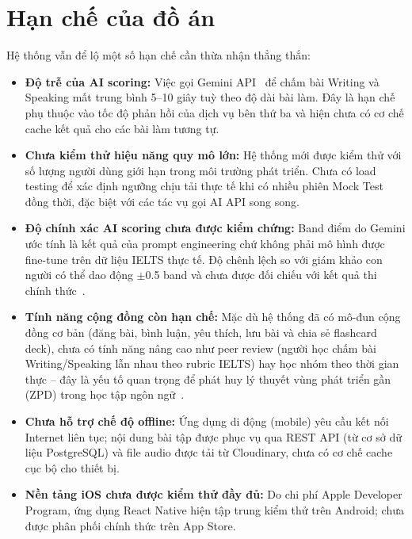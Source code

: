 \section{Hạn chế của đồ án}

Hệ thống vẫn để lộ một số hạn chế cần thừa nhận thẳng thắn:

\begin{itemize}
    \item \textbf{Độ trễ của AI scoring:} Việc gọi Gemini API~\cite{gemini-api} để chấm bài Writing và Speaking mất trung bình 5--10 giây tuỳ theo độ dài bài làm. Đây là hạn chế phụ thuộc vào tốc độ phản hồi của dịch vụ bên thứ ba và hiện chưa có cơ chế cache kết quả cho các bài làm tương tự.

    \item \textbf{Chưa kiểm thử hiệu năng quy mô lớn:} Hệ thống mới được kiểm thử với số lượng người dùng giới hạn trong môi trường phát triển. Chưa có load testing để xác định ngưỡng chịu tải thực tế khi có nhiều phiên Mock Test đồng thời, đặc biệt với các tác vụ gọi AI API song song.

    \item \textbf{Độ chính xác AI scoring chưa được kiểm chứng:} Band điểm do Gemini ước tính là kết quả của prompt engineering chứ không phải mô hình được fine-tune trên dữ liệu IELTS thực tế. Độ chênh lệch so với giám khảo con người có thể dao động $\pm$0.5 band và chưa được đối chiếu với kết quả thi chính thức~\cite{bachman1990fundamental}.

    \item \textbf{Tính năng cộng đồng còn hạn chế:} Mặc dù hệ thống đã có mô-đun cộng đồng cơ bản (đăng bài, bình luận, yêu thích, lưu bài và chia sẻ flashcard deck), chưa có tính năng nâng cao như peer review (người học chấm bài Writing/Speaking lẫn nhau theo rubric IELTS) hay học nhóm theo thời gian thực -- đây là yếu tố quan trọng để phát huy lý thuyết vùng phát triển gần (ZPD) trong học tập ngôn ngữ~\cite{vygotsky1978mind}.

    \item \textbf{Chưa hỗ trợ chế độ offline:} Ứng dụng di động (mobile) yêu cầu kết nối Internet liên tục; nội dung bài tập được phục vụ qua REST API (từ cơ sở dữ liệu PostgreSQL) và file audio được tải từ Cloudinary, chưa có cơ chế cache cục bộ cho thiết bị.

    \item \textbf{Nền tảng iOS chưa được kiểm thử đầy đủ:} Do chi phí Apple Developer Program, ứng dụng React Native hiện tập trung kiểm thử trên Android; chưa được phân phối chính thức trên App Store.
\end{itemize}

